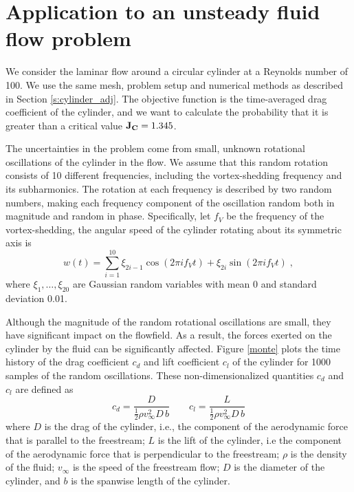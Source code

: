 \section{Application to an unsteady fluid flow problem}
\label{s:acc_monte_example}

We consider the laminar flow around a circular cylinder at a Reynolds number of
100.  We use the same mesh, problem setup and numerical methods as described in
Section \ref{s:cylinder_adj}.
The objective function is the time-averaged drag coefficient of
the cylinder, and we want to calculate the probability that it
is greater than a critical value ${\bf J_C} = 1.345$.

The uncertainties in the problem come from small,
unknown rotational oscillations
of the cylinder in the flow.  We assume that this random rotation consists of
10 different frequencies, including the vortex-shedding frequency and its
subharmonics.  The rotation at each frequency is described by two random
numbers, making each frequency component of the oscillation random both in
magnitude and random in phase.  Specifically, let $f_V$ be the
frequency of the vortex-shedding, the angular speed of the cylinder rotating
about its symmetric axis is
\begin{equation}\label{oscillations}
w(t) = \sum_{i=1}^{10} \xi_{2i-1} \cos (2\pi i f_V t)
                        + \xi_{2i} \sin (2\pi i f_V t) \;,
\end{equation}
where $\xi_1,\ldots, \xi_{20}$ are Gaussian random variables with mean 0 and
standard deviation 0.01.

Although the magnitude of the random rotational oscillations are small, they
have significant impact on the flowfield.  As a result, the forces exerted
on the cylinder by the fluid can be significantly affected.  Figure
\ref{monte} plots the time history of the drag coefficient $c_d$ and
lift coefficient $c_l$ of the cylinder for 1000 samples of the random
oscillations.  These non-dimensionalized quantities $c_d$ and $c_l$ are
defined as
\[ c_d = \frac{D}{\frac12 \rho v_{\infty}^2 D\, b} \qquad
   c_l = \frac{L}{\frac12 \rho v_{\infty}^2 D\, b} \]
where $D$ is the drag of the cylinder, i.e., the component of the aerodynamic
force that is parallel to the freestream; $L$ is the lift of the cylinder, i.e
the component of the aerodynamic force that is perpendicular to the
freestream; $\rho$ is the density of the fluid; $v_{\infty}$ is the speed
of the freestream flow; $D$ is the diameter of the cylinder, and $b$ is the
spanwise length of the cylinder.

